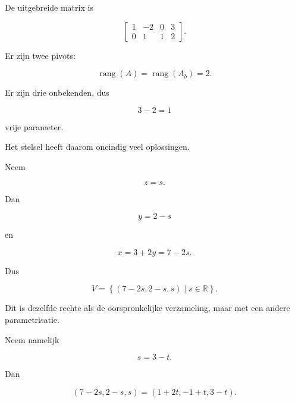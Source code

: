 \documentclass{ximera}
\begin{document}
\begin{oefening}{\oefG}
\begin{question}
\begin{oplossing}

De uitgebreide matrix is

\[
\left[
\begin{array}{ccc|c}
1&-2&0&3\\
0&1&1&2
\end{array}
\right].
\]

Er zijn twee pivots:

\[
\operatorname{rang}(A)
=
\operatorname{rang}(A_b)
=
2.
\]

Er zijn drie onbekenden, dus

\[
3-2=1
\]

vrije parameter.

Het stelsel heeft daarom oneindig veel oplossingen.

Neem

\[
z=s.
\]

Dan

\[
y=2-s
\]

en

\[
x=3+2y
=7-2s.
\]

Dus

\[
V=
\left\{
(7-2s,2-s,s)
\mid s\in\mathbb{R}
\right\}.
\]

Dit is dezelfde rechte als de oorspronkelijke verzameling,
maar met een andere parametrisatie.

Neem namelijk

\[
s=3-t.
\]

Dan

\[
(7-2s,2-s,s)
=
(1+2t,-1+t,3-t).
\]

\end{oplossing}

\end{question}

\end{oefening}



\end{document}
